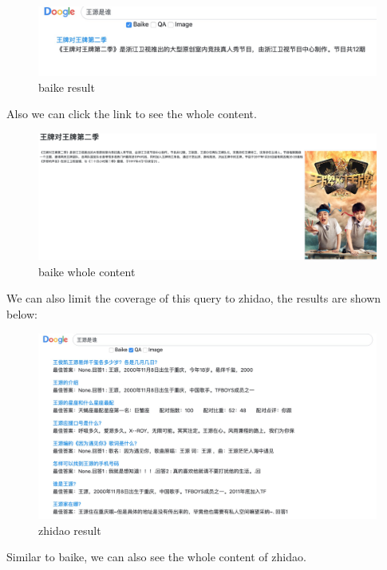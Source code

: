\documentclass[10pt,times,twocolumn]{article}
\begin{document}
\begin{figure}[ht]
\centering
\includegraphics[scale=0.13]{fig/8}
\caption{baike result}
\label{fig:label}
\end{figure}
\newline
Also we can click the link to see the whole content.
\begin{figure}[ht]
\centering
\includegraphics[scale=0.1]{fig/9}
\caption{baike whole content}
\label{fig:label}
\end{figure}
\newline
We can also limit the coverage of this query to zhidao, the results are shown below:
\begin{figure}[ht]
\centering
\includegraphics[scale=0.13]{fig/10}
\caption{zhidao result}
\label{fig:label}
\end{figure}
\newline
Similar to baike, we can also see the whole content of zhidao.
\end{document}
